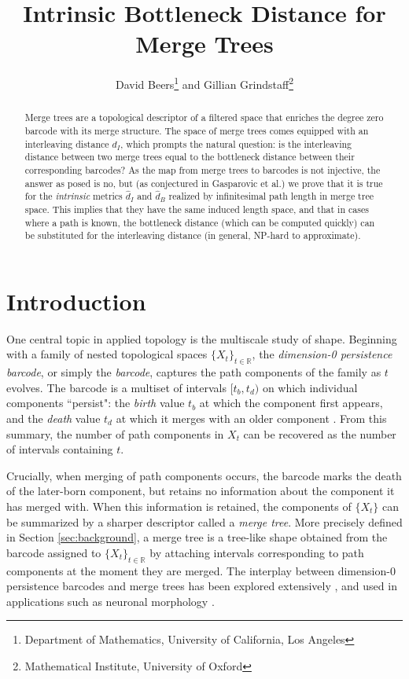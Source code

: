 \documentclass{article}
\title{Intrinsic Bottleneck Distance for Merge Trees}
\author{David Beers\thanks{Department of Mathematics, University of California, Los Angeles}\; and Gillian Grindstaff\thanks{Mathematical Institute, University of Oxford}}
\theoremstyle{definition}
\begin{document}
\maketitle

\begin{abstract}
Merge trees are a topological descriptor of a filtered space that enriches the degree zero barcode with its merge structure. The space of merge trees comes equipped with an interleaving distance $d_I$, which prompts the natural question: is the interleaving distance between two merge trees equal to the bottleneck distance between their corresponding barcodes? As the map from merge trees to barcodes is not injective, the answer as posed is no, but (as conjectured in Gasparovic et al.) we prove that it is true for the \emph{intrinsic} metrics $\widehat{d}_I$ and $\widehat{d}_B$ realized by infinitesimal path length in merge tree space. This implies that they have the same induced length space, and that in cases where a path is known, the bottleneck distance (which can be computed quickly) can be substituted for the interleaving distance (in general, NP-hard to approximate).
\end{abstract}

\section{Introduction}

One central topic in applied topology is the multiscale study of shape. Beginning with a family of nested topological spaces $\{X_t\}_{t\in \mathbb{R}}$, the \emph{dimension-0 persistence barcode}, or simply the \emph{barcode}, captures the path components of the family as $t$ evolves. The barcode is a multiset of intervals $[t_b,t_d)$ on which individual components ``persist": the \emph{birth} value $t_b$ at which the component first appears, and the \emph{death} value $t_d$ at which it merges with an older component \cite{zomorodian2004computing}. From this summary, the number of path components in $X_t$ can be recovered as the number of intervals containing $t$.

Crucially, when merging of path components occurs, the barcode marks the death of the later-born component, but retains no information about the component it has merged with. When this information is retained, the components of $\{X_t\}$ can be summarized by a sharper descriptor called a \emph{merge tree}. More precisely defined in Section \ref{sec:background}, a merge tree is a tree-like shape obtained from the barcode assigned to $\{X_t\}_{t\in\mathbb{R}}$ by attaching intervals corresponding to path components at the moment they are merged. The interplay between dimension-0 persistence barcodes and merge trees has been explored extensively \cite{curry2018fiber,TreesBarcodes,curry2024trees}, and used in applications such as neuronal morphology \cite{TMD, li2017metrics, kanari2019objective, beers2023barcodes}.
\end{document}

